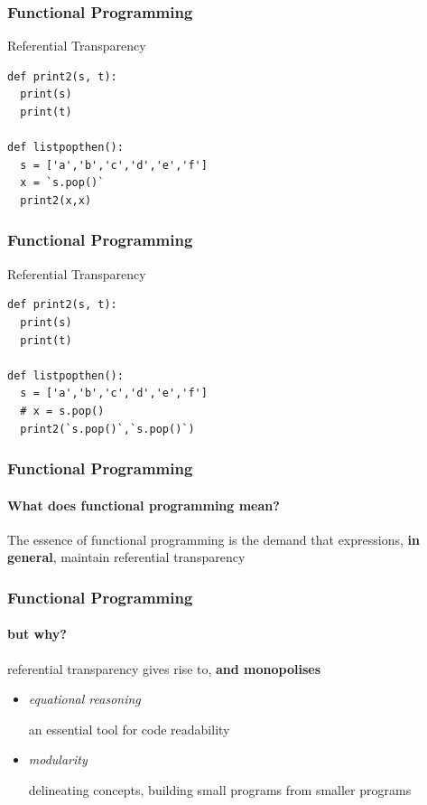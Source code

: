 \begin{frame}[fragile]
\frametitle{Functional Programming}
\begin{block}{Referential Transparency}
\begin{lstlisting}[style=python,mathescape]
def print2(s, t):
  print(s)
  print(t)

def listpopthen():
  s = ['a','b','c','d','e','f']
  x = `s.pop()`
  print2(x,x)
\end{lstlisting}
\end{block}
\end{frame}


\begin{frame}[fragile]
\frametitle{Functional Programming}
\begin{block}{Referential Transparency}
\begin{lstlisting}[style=python,mathescape]
def print2(s, t):
  print(s)
  print(t)

def listpopthen():
  s = ['a','b','c','d','e','f']
  # x = s.pop()
  print2(`s.pop()`,`s.pop()`)
\end{lstlisting}
\end{block}
\end{frame}


\begin{frame}
\frametitle{Functional Programming}
\framesubtitle{What does functional programming mean?}
\begin{block}{The essence of functional programming}
is the demand that expressions, \textbf{in general}, maintain referential transparency
\end{block}
\end{frame}


\begin{frame}
\frametitle{Functional Programming}
\framesubtitle{but why?}
\begin{block}{referential transparency gives rise to, \textbf{and monopolises}}
\begin{itemize}
\item \emph{equational reasoning}

      an essential tool for code readability
\item \emph{modularity}

      delineating concepts, building small programs from smaller programs
\end{itemize}
\end{block}
\end{frame}


